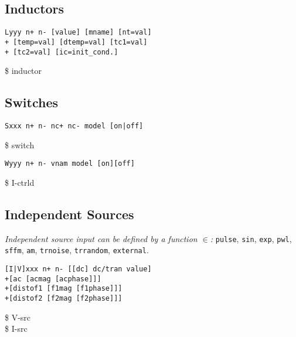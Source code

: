 \subsection*{Inductors}
\begin{lstlisting}
Lyyy n+ n- [value] [mname] [nt=val]
+ [temp=val] [dtemp=val] [tc1=val] 
+ [tc2=val] [ic=init_cond.]
\end{lstlisting}
 \$ inductor \\


\subsection*{Switches}
\begin{lstlisting}
Sxxx n+ n- nc+ nc- model [on|off]
\end{lstlisting}
 \$ switch \\
\begin{lstlisting}
Wyyy n+ n- vnam model [on][off]
\end{lstlisting}
 \$ I-ctrl\textquotesingle d \\


\subsection*{Independent Sources}
\textit{Independent source input can be defined by a function $\in$: } \texttt{pulse}, \texttt{sin}, \texttt{exp}, \texttt{pwl}, \texttt{sffm}, \texttt{am}, \texttt{trnoise}, \texttt{trrandom}, \texttt{external}.\\

\begin{lstlisting}
[I|V]xxx n+ n- [[dc] dc/tran value]
+[ac [acmag [acphase]]] 
+[distof1 [f1mag [f1phase]]]
+[distof2 [f2mag [f2phase]]]
\end{lstlisting}

 \$ V-src \\
 \$ I-src \\


